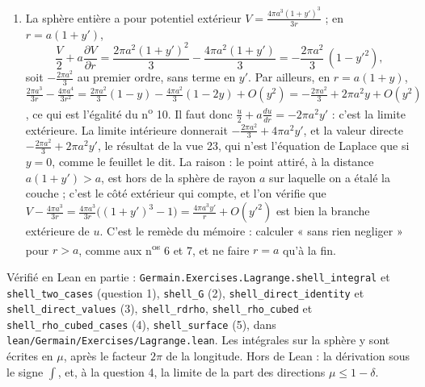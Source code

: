 \documentclass[11pt,a4paper]{article}
\begin{document}
\begin{solution}
\begin{enumerate}
  vers $0$. Toute l'intégrale se ramasse dans une calotte aussi petite qu'on veut
  autour de la direction du point attiré, là où la fonction à intégrer devient
  infinie ; la fonction $\frac{r(r^2-a^2)}{4\pi}\rho^3$, positive et d'intégrale $1$,
  est ce qu'on appelle aujourd'hui le noyau de Poisson de la boule. Le
  n\textsuperscript{o} 5 intègre la limite $\frac\rho2 + a\frac{d\rho}{dr}$, nulle
  pour $\mu < 1$, au lieu de prendre la limite des intégrales : il échange la limite
  $r \to a$ et l'intégration, ce que rien ne permet ici (la convergence n'est ni
  uniforme ni dominée près de $\mu = 1$). La somme « de toutes les valeurs
  successives de la differentielle » n'est pas en cause.
\item La sphère entière a pour potentiel extérieur
  $V = \frac{4\pi a^3(1+y')^3}{3r}$ ; en $r = a(1+y')$,
  \[
  \frac V2 + a\frac{\partial V}{\partial r}
  = \frac{2\pi a^2(1+y')^2}{3} - \frac{4\pi a^2(1+y')}{3}
  = -\frac{2\pi a^2}{3}\,(1 - y'^2),
  \]
  soit $-\frac{2\pi a^2}{3}$ au premier ordre, sans terme en $y'$. Par ailleurs, en
  $r = a(1+y)$, $\frac{2\pi a^3}{3r} - \frac{4\pi a^4}{3r^2}
  = \frac{2\pi a^2}{3}(1 - y) - \frac{4\pi a^2}{3}(1 - 2y) + O(y^2)
  = -\frac{2\pi a^2}{3} + 2\pi a^2y + O(y^2)$, ce qui est l'égalité du
  n\textsuperscript{o} 10. Il faut donc
  $\frac u2 + a\frac{du}{dr} = -2\pi a^2y'$ : c'est la limite extérieure. La limite
  intérieure donnerait $-\frac{2\pi a^2}{3} + 4\pi a^2y'$, et la valeur directe
  $-\frac{2\pi a^2}{3} + 2\pi a^2y'$, le résultat de la vue 23, qui n'est l'équation
  de Laplace que si $y = 0$, comme le feuillet le dit. La raison : le point attiré,
  à la distance $a(1+y') > a$, est hors de la sphère de rayon $a$ sur laquelle on a
  étalé la couche ; c'est le côté extérieur qui compte, et l'on vérifie que
  $V - \frac{4\pi a^3}{3r} = \frac{4\pi a^3}{3r}\bigl((1+y')^3 - 1\bigr)
  = \frac{4\pi a^3y'}{r} + O(y'^2)$ est bien la branche extérieure de $u$. C'est le
  remède du mémoire : calculer « sans rien negliger » pour $r > a$, comme aux
  n\textsuperscript{os} 6 et 7, et ne faire $r = a$ qu'à la fin.
\end{enumerate}

Vérifié en Lean en partie : \texttt{Germain.Exercises.Lagrange.shell\_integral} et
\texttt{shell\_two\_cases} (question 1), \texttt{shell\_G} (2), \texttt{shell\_direct\_identity}
et \texttt{shell\_direct\_values} (3), \texttt{shell\_rdrho}, \texttt{shell\_rho\_cubed} et
\texttt{shell\_rho\_cubed\_cases} (4), \texttt{shell\_surface} (5), dans
\texttt{lean/Germain/Exercises/Lagrange.lean}. Les intégrales sur la sphère y sont écrites en $\mu$, après le facteur
$2\pi$ de la longitude. Hors de Lean : la dérivation sous le signe $\int$, et, à la question 4,
la limite de la part des directions $\mu \le 1 - \delta$.

\end{solution}
\end{document}
